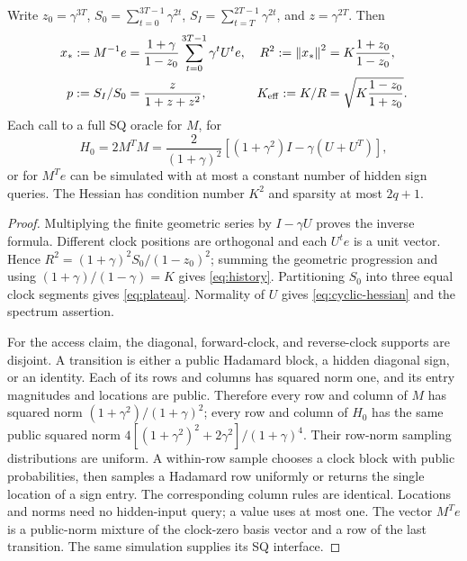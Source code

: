 \begin{lemma}\label{lem:cyclic-history}
Write $z_0=\gamma^{3T}$, $S_0=\sum_{t=0}^{3T-1}\gamma^{2t}$,
$S_I=\sum_{t=T}^{2T-1}\gamma^{2t}$, and $z=\gamma^{2T}$.  Then
\begin{align}
 x_*:=M^{-1}e
 &=\frac{1+\gamma}{1-z_0}\sum_{t=0}^{3T-1}\gamma^tU^te,
 & R^2:=\left\lVert x_*\right\rVert^2&=K\frac{1+z_0}{1-z_0},\label{eq:history}\\
 p:=S_I/S_0&=\frac{z}{1+z+z^2},
 & K_{\rm eff}:=K/R&=\sqrt{K\frac{1-z_0}{1+z_0}}.
 \label{eq:plateau}
\end{align}
Each call to a full SQ oracle for $M$, for
\begin{equation}\label{eq:cyclic-hessian}
 H_0=2M^TM=\frac{2}{(1+\gamma)^2}
       [(1+\gamma^2)I-\gamma(U+U^T)],
\end{equation}
or for $M^Te$ can be simulated with at most a constant number of hidden
sign queries.  The Hessian has condition number $K^2$ and sparsity
at most $2q+1$.
\end{lemma}

\begin{proof}
Multiplying the finite geometric series by $I-\gamma U$ proves the
inverse formula.  Different clock positions are orthogonal and each
$U^te$ is a unit vector.  Hence
$R^2=(1+\gamma)^2 S_0/(1-z_0)^2$; summing the geometric progression and
using $(1+\gamma)/(1-\gamma)=K$ gives \eqref{eq:history}.
Partitioning $S_0$ into three equal clock segments gives \eqref{eq:plateau}.
Normality of $U$ gives \eqref{eq:cyclic-hessian} and the spectrum assertion.

For the access claim, the diagonal, forward-clock, and reverse-clock
supports are disjoint.  A transition is either a public Hadamard block,
a hidden diagonal sign, or an identity.  Each of its rows and columns has
squared norm one, and its entry magnitudes and locations are public.  Therefore every row
and column of $M$ has squared norm $(1+\gamma^2)/(1+\gamma)^2$; every
row and column of $H_0$ has the same public squared norm
$4[(1+\gamma^2)^2+2\gamma^2]/(1+\gamma)^4$.
Their row-norm sampling distributions are uniform.  A within-row sample
chooses a clock block with public probabilities, then samples a Hadamard
row uniformly or returns the single location of a sign entry.
The corresponding column rules are identical.  Locations and norms need
no hidden-input query; a value uses at most one.  The vector $M^Te$ is a
public-norm mixture of the clock-zero basis vector and a row of the
last transition.  The same simulation supplies its SQ interface.
\end{proof}

